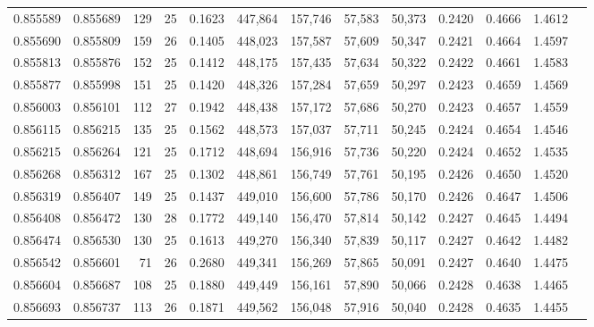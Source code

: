 \begin{tabular}{rrrrrrrrrrrrr}
0.855589 & 0.855689 &   129 &  25 &                                     0.1623 & 447,864 & 157,746 &  57,583 &  50,373 & 0.2420 & 0.4666 & 1.4612 \\
0.855690 & 0.855809 &   159 &  26 &                                     0.1405 & 448,023 & 157,587 &  57,609 &  50,347 & 0.2421 & 0.4664 & 1.4597 \\
0.855813 & 0.855876 &   152 &  25 &                                     0.1412 & 448,175 & 157,435 &  57,634 &  50,322 & 0.2422 & 0.4661 & 1.4583 \\
0.855877 & 0.855998 &   151 &  25 &                                     0.1420 & 448,326 & 157,284 &  57,659 &  50,297 & 0.2423 & 0.4659 & 1.4569 \\
0.856003 & 0.856101 &   112 &  27 &                                     0.1942 & 448,438 & 157,172 &  57,686 &  50,270 & 0.2423 & 0.4657 & 1.4559 \\
0.856115 & 0.856215 &   135 &  25 &                                     0.1562 & 448,573 & 157,037 &  57,711 &  50,245 & 0.2424 & 0.4654 & 1.4546 \\
0.856215 & 0.856264 &   121 &  25 &                                     0.1712 & 448,694 & 156,916 &  57,736 &  50,220 & 0.2424 & 0.4652 & 1.4535 \\
0.856268 & 0.856312 &   167 &  25 &                                     0.1302 & 448,861 & 156,749 &  57,761 &  50,195 & 0.2426 & 0.4650 & 1.4520 \\
0.856319 & 0.856407 &   149 &  25 &                                     0.1437 & 449,010 & 156,600 &  57,786 &  50,170 & 0.2426 & 0.4647 & 1.4506 \\
0.856408 & 0.856472 &   130 &  28 &                                     0.1772 & 449,140 & 156,470 &  57,814 &  50,142 & 0.2427 & 0.4645 & 1.4494 \\
0.856474 & 0.856530 &   130 &  25 &                                     0.1613 & 449,270 & 156,340 &  57,839 &  50,117 & 0.2427 & 0.4642 & 1.4482 \\
0.856542 & 0.856601 &    71 &  26 &                                     0.2680 & 449,341 & 156,269 &  57,865 &  50,091 & 0.2427 & 0.4640 & 1.4475 \\
0.856604 & 0.856687 &   108 &  25 &                                     0.1880 & 449,449 & 156,161 &  57,890 &  50,066 & 0.2428 & 0.4638 & 1.4465 \\
0.856693 & 0.856737 &   113 &  26 &                                     0.1871 & 449,562 & 156,048 &  57,916 &  50,040 & 0.2428 & 0.4635 & 1.4455 \\

\end{tabular}
